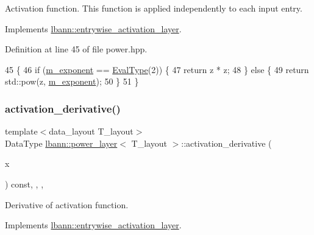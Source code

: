 Activation function. This function is applied independently to each input entry. 

Implements \hyperlink{classlbann_1_1entrywise__activation__layer_a69269401530a2112b66660383464bab9}{lbann\+::entrywise\+\_\+activation\+\_\+layer}.



Definition at line 45 of file power.\+hpp.


\begin{DoxyCode}
45                                                  \{
46     \textcolor{keywordflow}{if} (\hyperlink{classlbann_1_1power__layer_a778b995d25e24f5c82ab85cfeab2ee41}{m\_exponent} == \hyperlink{base_8hpp_a3266f5ac18504bbadea983c109566867}{EvalType}(2)) \{
47       \textcolor{keywordflow}{return} z * z;
48     \} \textcolor{keywordflow}{else} \{
49       \textcolor{keywordflow}{return} std::pow(z, \hyperlink{classlbann_1_1power__layer_a778b995d25e24f5c82ab85cfeab2ee41}{m\_exponent});
50     \}
51   \}
\end{DoxyCode}
\mbox{\label{classlbann_1_1power__layer_af879c6b5488e1c8efe9e8c92b1be474c}} 
\subsubsection{\texorpdfstring{activation\+\_\+derivative()}{activation\_derivative()}}
{\footnotesize\ttfamily template$<$data\+\_\+layout T\+\_\+layout$>$ \\
Data\+Type \hyperlink{classlbann_1_1power__layer}{lbann\+::power\+\_\+layer}$<$ T\+\_\+layout $>$\+::activation\+\_\+derivative (\begin{DoxyParamCaption}\item[{Data\+Type}]{x }\end{DoxyParamCaption}) const\hspace{0.3cm}{\ttfamily [inline]}, {\ttfamily [override]}, {\ttfamily [protected]}, {\ttfamily [virtual]}}

Derivative of activation function. 

Implements \hyperlink{classlbann_1_1entrywise__activation__layer_a7676a4c5060452a38264993554e79f8e}{lbann\+::entrywise\+\_\+activation\+\_\+layer}.



